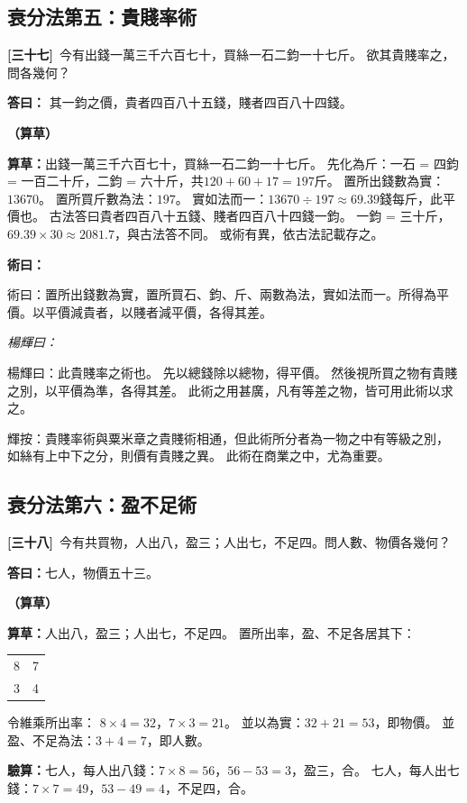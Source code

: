 \documentclass[11pt,a4paper]{article}
\newenvironment{method}{%
  \par\noindent\textcolor{methodcolor}{\textbf{術曰：}}%
  \ignorespaces
}{\par\vspace{0.5em}}
\newenvironment{caocao}{%
  \par\noindent\textcolor{caocaocolor}{\small\textbf{（算草）}}%
  \ignorespaces
}{\par\vspace{0.5em}}
\newenvironment{yanghuicomment}{%
  \par\noindent\textcolor{commentarycolor}{\small\textit{楊輝曰：}}%
  \ignorespaces
}{\par\vspace{0.5em}}
\newcommand{\problemnum}[1]{\textbf{[\ignorespaces#1\unskip]}}
\begin{document}
\subsection{衰分法第五：貴賤率術}

\noindent\problemnum{三十七}\,
今有出錢一萬三千六百七十，買絲一石二鈞一十七斤。
欲其貴賤率之，問各幾何？

\noindent\textcolor{answercolor}{\textbf{答曰：}}
其一鈞之價，貴者四百八十五錢，賤者四百八十四錢。

\begin{caocao}
\textbf{算草：}出錢一萬三千六百七十，買絲一石二鈞一十七斤。
先化為斤：一石 = 四鈞 = 一百二十斤，二鈞 = 六十斤，共$120 + 60 + 17 = 197$斤。
置所出錢數為實：$13670$。
置所買斤數為法：$197$。
實如法而一：$13670 \div 197 \approx 69.39$錢每斤，此平價也。
古法答曰貴者四百八十五錢、賤者四百八十四錢一鈞。
一鈞 = 三十斤，$69.39 \times 30 \approx 2081.7$，與古法答不同。
或術有異，依古法記載存之。
\end{caocao}

\begin{method}
術曰：置所出錢數為實，置所買石、鈞、斤、兩數為法，實如法而一。所得為平價。以平價減貴者，以賤者減平價，各得其差。
\end{method}

\begin{yanghuicomment}
楊輝曰：此貴賤率之術也。
先以總錢除以總物，得平價。
然後視所買之物有貴賤之別，以平價為準，各得其差。
此術之用甚廣，凡有等差之物，皆可用此術以求之。

輝按：貴賤率術與粟米章之貴賤術相通，但此術所分者為一物之中有等級之別，
如絲有上中下之分，則價有貴賤之異。
此術在商業之中，尤為重要。
\end{yanghuicomment}

\subsection{衰分法第六：盈不足術}

\noindent\problemnum{三十八}\,
今有共買物，人出八，盈三；人出七，不足四。問人數、物價各幾何？

\noindent\textcolor{answercolor}{\textbf{答曰：}}七人，物價五十三。

\begin{caocao}
\textbf{算草：}人出八，盈三；人出七，不足四。
置所出率，盈、不足各居其下：
\begin{center}
\begin{tabular}{cc}
8 & 7 \\
3 & 4 \\
\end{tabular}
\end{center}
令維乘所出率：
$8 \times 4 = 32$，$7 \times 3 = 21$。
並以為實：$32 + 21 = 53$，即物價。
並盈、不足為法：$3 + 4 = 7$，即人數。

\textbf{驗算：}七人，每人出八錢：$7 \times 8 = 56$，$56 - 53 = 3$，盈三，合。
七人，每人出七錢：$7 \times 7 = 49$，$53 - 49 = 4$，不足四，合。
\end{caocao}
\end{document}
